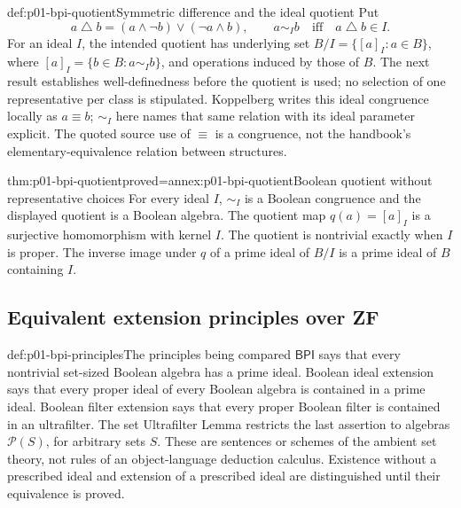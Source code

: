 \begin{hbdefinition}{def:p01-bpi-quotient}{Symmetric difference and the ideal quotient}
Put
\[
 a\mathbin{\triangle}b=(a\wedge\neg b)\vee(\neg a\wedge b),
 \qquad
 a\sim_I b\quad\text{iff}\quad a\mathbin{\triangle}b\in I.
\]
For an ideal \(I\), the intended quotient has underlying set
\(B/I=\{[a]_I:a\in B\}\), where
\([a]_I=\{b\in B:a\sim_I b\}\), and operations induced by those
of \(B\). The next result establishes well-definedness before the quotient
is used; no selection of one representative per class is stipulated.
Koppelberg writes this ideal congruence locally as \(a\equiv b\);
\(\sim_I\) here names that same relation with its ideal parameter
explicit. The quoted source use of \(\equiv\) is a congruence, not the
handbook's elementary-equivalence relation between structures.
\end{hbdefinition}

\begin{hblemma}{thm:p01-bpi-quotient}{proved=annex:p01-bpi-quotient}{Boolean quotient without representative choices}
For every ideal \(I\), \(\sim_I\) is a Boolean congruence and the
displayed quotient is a Boolean algebra. The quotient map
\(q(a)=[a]_I\) is a surjective homomorphism with kernel \(I\).
The quotient is nontrivial exactly when \(I\) is proper. The inverse
image under \(q\) of a prime ideal of \(B/I\) is a prime ideal of
\(B\) containing \(I\).
\end{hblemma}

\subsection{Equivalent extension principles over ZF}
\label{sec:p01-bpi-extension-equivalence}

\begin{hbdefinition}{def:p01-bpi-principles}{The principles being compared}
\(\mathsf{BPI}\) says that every nontrivial set-sized Boolean algebra
has a prime ideal. Boolean ideal extension says that every proper ideal of
every Boolean algebra is contained in a prime ideal. Boolean filter extension
says that every proper Boolean filter is contained in an ultrafilter.
The set Ultrafilter Lemma restricts the last assertion to algebras
\(\mathcal P(S)\), for arbitrary sets \(S\).
These are sentences or schemes of the ambient set theory, not rules of an
object-language deduction calculus. Existence without a prescribed ideal
and extension of a prescribed ideal are distinguished until their
equivalence is proved.
\end{hbdefinition}

